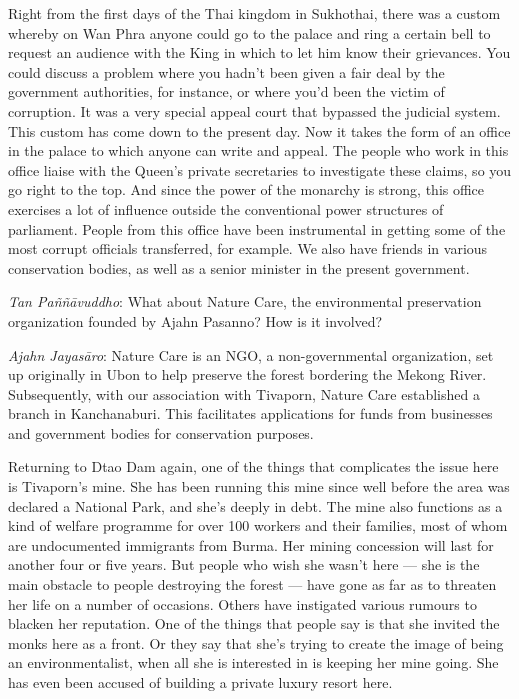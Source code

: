 Right from the first days of the Thai kingdom in Sukhothai, there was a
custom whereby on Wan Phra anyone could go to the palace and ring a
certain bell to request an audience with the King in which to let him
know their grievances. You could discuss a problem where you hadn't been
given a fair deal by the government authorities, for instance, or where
you'd been the victim of corruption. It was a very special appeal court
that bypassed the judicial system. This custom has come down to the
present day. Now it takes the form of an office in the palace to which
anyone can write and appeal. The people who work in this office liaise
with the Queen's private secretaries to investigate these claims, so you
go right to the top. And since the power of the monarchy is strong, this
office exercises a lot of influence outside the conventional power
structures of parliament. People from this office have been instrumental
in getting some of the most corrupt officials transferred, for example.
We also have friends in various conservation bodies, as well as a senior
minister in the present government.

\emph{Tan Paññāvuddho}‎: What about Nature Care, the environmental
preservation organization founded by Ajahn Pasanno? How is it involved?

\emph{Ajahn Jayasāro‎}: Nature Care is an NGO, a non-governmental
organization, set up originally in Ubon to help preserve the forest
bordering the Mekong River. Subsequently, with our association with
Tivaporn, Nature Care established a branch in Kanchanaburi. This
facilitates applications for funds from businesses and government bodies
for conservation purposes.

Returning to Dtao Dam again, one of the things that complicates the
issue here is Tivaporn's mine. She has been running this mine since well
before the area was declared a National Park, and she's deeply in debt.
The mine also functions as a kind of welfare programme for over 100
workers and their families, most of whom are undocumented immigrants
from Burma. Her mining concession will last for another four or five
years. But people who wish she wasn't here --- she is the main obstacle
to people destroying the forest --- have gone as far as to threaten her
life on a number of occasions. Others have instigated various rumours to
blacken her reputation. One of the things that people say is that she
invited the monks here as a front. Or they say that she's trying to
create the image of being an environmentalist, when all she is
interested in is keeping her mine going. She has even been accused of
building a private luxury resort here.

